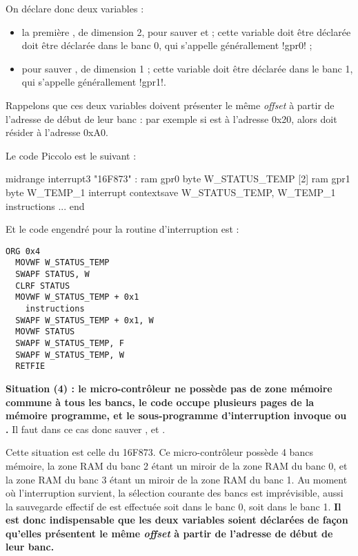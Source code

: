 \begin{piccolo}
On déclare donc deux variables :
\begin{itemize}
  \item la première , de dimension 2, pour sauver  et  ; cette variable doit être déclarée doit être déclarée dans le banc 0, qui s'appelle générallement \pic!gpr0! ; 
  \item {} pour sauver , de dimension 1 ; cette variable doit être déclarée dans le banc 1, qui s'appelle générallement \pic!gpr1!.

\end{itemize}

Rappelons que ces deux variables doivent présenter le même \emph{offset} à partir de l'adresse de début de leur banc : par exemple si  est à l'adresse 0x20, alors  doit résider à l'adresse 0xA0.

Le code Piccolo est le suivant :
\begin{piccolo}
midrange interrupt3 "16F873" :
ram gpr0 {
  byte W_STATUS_TEMP [2]
}
ram gpr1 {
  byte W_TEMP_1
}
interrupt contextsave W_STATUS_TEMP, W_TEMP_1 {
  instructions
}
...
end
\end{piccolo}

Et le code engendré pour la routine d'interruption est :
\begin{lstlisting}[language=assembleur]
  ORG 0x4
  MOVWF W_STATUS_TEMP
  SWAPF STATUS, W
  CLRF STATUS
  MOVWF W_STATUS_TEMP + 0x1
    instructions
  SWAPF W_STATUS_TEMP + 0x1, W
  MOVWF STATUS
  SWAPF W_STATUS_TEMP, F
  SWAPF W_STATUS_TEMP, W
  RETFIE
\end{lstlisting}





\textbf{Situation (4) : le micro-contrôleur ne possède pas de zone mémoire commune à tous les bancs, le code occupe plusieurs pages de la mémoire programme, et le sous-programme d'interruption invoque  ou .} Il faut dans ce cas donc sauver ,  et .

Cette situation est celle du 16F873. Ce micro-contrôleur possède 4 bancs mémoire, la zone RAM du banc 2 étant un miroir de la zone RAM du banc 0, et la zone RAM du banc 3 étant un miroir de la zone RAM du banc 1. Au moment où l'interruption survient, la sélection courante des bancs est imprévisible, aussi la sauvegarde effectif de  est effectuée soit dans le banc 0, soit dans le banc 1. \textbf{Il est donc indispensable que les deux variables soient déclarées de façon qu'elles présentent le même \emph{offset} à partir de l'adresse de début de leur banc.}


\end{piccolo}
